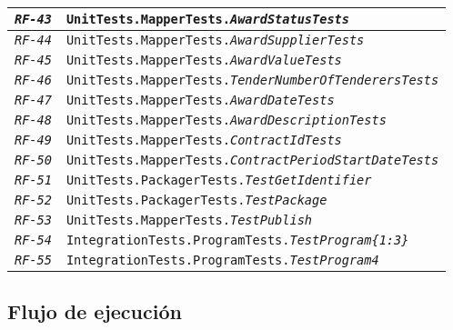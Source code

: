 \begin{longtable}{|| M{3cm} | M{12cm} ||}
                \hline
                    \texttt{\textit{RF-43}} & \texttt{UnitTests.MapperTests.\textit{AwardStatusTests}} \\
                \hline
                    \texttt{\textit{RF-44}} & \texttt{UnitTests.MapperTests.\textit{AwardSupplierTests}} \\
                \hline
                    \texttt{\textit{RF-45}} & \texttt{UnitTests.MapperTests.\textit{AwardValueTests}} \\
                \hline
                    \texttt{\textit{RF-46}} & \texttt{UnitTests.MapperTests.\textit{TenderNumberOfTenderersTests}} \\
                \hline
                    \texttt{\textit{RF-47}} & \texttt{UnitTests.MapperTests.\textit{AwardDateTests}} \\
                \hline
                    \texttt{\textit{RF-48}} & \texttt{UnitTests.MapperTests.\textit{AwardDescriptionTests}} \\
                \hline
                    \texttt{\textit{RF-49}} & \texttt{UnitTests.MapperTests.\textit{ContractIdTests}} \\
                \hline
                    \texttt{\textit{RF-50}} & \texttt{UnitTests.MapperTests.\textit{ContractPeriodStartDateTests}} \\
                \hline
                    \texttt{\textit{RF-51}} & \texttt{UnitTests.PackagerTests.\textit{TestGetIdentifier}} \\
                \hline
                    \texttt{\textit{RF-52}} & \texttt{UnitTests.PackagerTests.\textit{TestPackage}} \\
                \hline
                    \texttt{\textit{RF-53}} & \texttt{UnitTests.MapperTests.\textit{TestPublish}} \\
                \hline
                    \texttt{\textit{RF-54}} & \texttt{IntegrationTests.ProgramTests.\textit{TestProgram\{1:3\}}} \\
                \hline
                    \texttt{\textit{RF-55}} & \texttt{IntegrationTests.ProgramTests.\textit{TestProgram4}} \\
                \hline
        \end{longtable}
        \addtocounter{table}{-1}
        
    \vspace{1cm}
    
    \subsection{Flujo de ejecución} \label{subsec:flujo}
        
